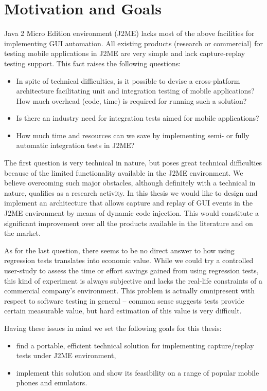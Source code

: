 \section{Motivation and Goals}

Java 2 Micro Edition environment (J2ME) lacks most of the above facilities for implementing GUI
automation. All existing products (research or commercial) for testing mobile applications in J2ME
are very simple and lack capture-replay testing support. This fact raises the following questions:
%
\begin{itemize}
    \item In spite of technical difficulties, is it possible to devise a cross-platform architecture 
	facilitating unit and integration testing of mobile applications? How much overhead (code, time) 
	is required for running such a solution?
    \item Is there an industry need for integration tests aimed for mobile applications?
    \item How much time and resources can we save by implementing semi- or fully automatic
    integration tests in J2ME?
\end{itemize}
%
The first question is very technical in nature, but poses great technical difficulties because
of the limited functionality available in the J2ME environment. We believe overcoming such major
obstacles, although definitely with a technical in nature, qualifies as a research activity. In this thesis we
would like to design and implement an architecture that allows capture and replay of GUI events in the J2ME environment
by means of dynamic code injection. This would constitute a significant improvement over all the products available 
in the literature and on the market.

As for the last question, there seems to be no direct answer to how using regression tests
translates into economic value. While we could try a controlled user-study to assess the time or effort 
savings gained from using regression tests, this kind of experiment is always subjective 
and lacks the real-life constraints of a commercial company's environment. This problem is 
actually omnipresent with respect to software testing in general -- common sense suggests tests provide 
certain measurable value, but hard estimation of this value is very difficult.

Having these issues in mind we set the following goals for this thesis:
\begin{itemize}
    \item find a portable, efficient technical solution for implementing capture/replay tests under 
    J2ME environment,
    \item implement this solution and show its feasibility on a range of popular 
    mobile phones and emulators.
\end{itemize}


